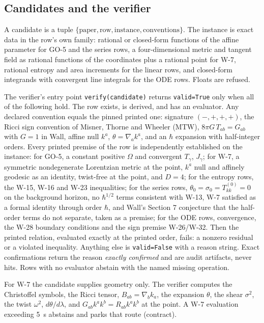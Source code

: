 \documentclass[11pt]{article}
\begin{document}
\subsection{Candidates and the verifier}

A candidate is a tuple $\{\text{paper}, \text{row}, \text{instance}, \text{conventions}\}$. The instance is exact data in the row's own family: rational or closed-form functions of the affine parameter for GO-5 and the series rows, a four-dimensional metric and tangent field as rational functions of the coordinates plus a rational point for W-7, rational entropy and area increments for the linear rows, and closed-form integrands with convergent line integrals for the ODE rows. Floats are refused.

The verifier's entry point \texttt{verify(candidate)} returns \texttt{valid=True} only when all of the following hold. The row exists, is derived, and has an evaluator. Any declared convention equals the pinned printed one: signature $(-,+,+,+)$, the Ricci sign convention of Misner, Thorne and Wheeler (MTW), $8\pi G\,T_{ab} = G_{ab}$ with $G = 1$ in Wall, affine null $k^a$, $\theta = \nabla_a k^a$, and an $\hbar$ expansion with half-integer orders. Every printed premise of the row is independently established on the instance: for GO-5, a constant positive $\Omega$ and convergent $T_\gamma$, $J_\gamma$; for W-7, a symmetric nondegenerate Lorentzian metric at the point, $k^a$ null and affinely geodesic as an identity, twist-free at the point, and $D = 4$; for the entropy rows, the W-15, W-16 and W-23 inequalities; for the series rows, $\theta_0 = \sigma_0 = T^{(0)}_{kk} = 0$ on the background horizon, no $\hbar^{1/2}$ terms consistent with W-13, W-7 satisfied as a formal identity through order $\hbar$, and Wall's Section 7 conjecture that the half-order terms do not separate, taken as a premise; for the ODE rows, convergence, the W-28 boundary conditions and the sign premise W-26/W-32. Then the printed relation, evaluated exactly at the printed order, fails: a nonzero residual or a violated inequality. Anything else is \texttt{valid=False} with a reason string. Exact confirmations return the reason \emph{exactly confirmed} and are audit artifacts, never hits. Rows with no evaluator abstain with the named missing operation.

For W-7 the candidate supplies geometry only. The verifier computes the Christoffel symbols, the Ricci tensor, $B_{ab} = \nabla_b k_a$, the expansion $\theta$, the shear $\sigma^2$, the twist $\omega^2$, $d\theta/d\lambda$, and $G_{ab}k^ak^b = R_{ab}k^ak^b$ at the point. A W-7 evaluation exceeding 5~s abstains and parks that route (contract).
\end{document}
